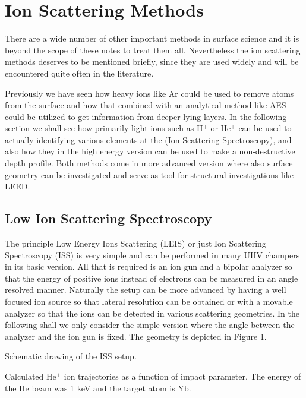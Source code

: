 \newpage
\chapter{Ion Scattering Methods}

There are a wide number of other important methods in surface science and it is beyond the scope of these notes to treat them all. Nevertheless the ion scattering methods deserves to be mentioned briefly, since they are used widely and will be encountered quite often in the literature.

Previously we have seen how heavy ions like Ar could be used to remove atoms from the surface and how that combined with an analytical method like AES could be utilized to get information from deeper lying layers. In the following section we shall see how primarily light ions such as H$^+$ or He$^+$ can be used to actually identifying various elements at the (Ion Scattering Spectroscopy), and also how they in the high energy version can be used to make a non-destructive depth profile. Both methods come in more advanced version where also surface geometry can be investigated and serve as tool for structural investigations like LEED.


\section{Low Ion Scattering Spectroscopy}
The principle Low Energy Ions Scattering (LEIS) or just Ion Scattering Spectroscopy (ISS) is very simple and can be performed in many UHV champers in its basic version. All that is required is an ion gun and a bipolar analyzer so that the energy of positive ions instead of electrons can be measured in an angle resolved manner. Naturally the setup can be more advanced by having a well focused ion source so that lateral resolution can be obtained or with a movable analyzer so that the ions can be detected in various scattering geometries. In the following shall we only consider the simple version where the angle between the analyzer and the ion gun is fixed. The geometry is depicted in Figure 1. 

\vspace*{8cm}

 Schematic drawing of the ISS setup.

\vspace{1cm}


\vspace*{8cm}

 Calculated He$^+$ ion trajectories as a function of impact parameter. The energy of the He beam was 1 keV and the target atom is Yb.

